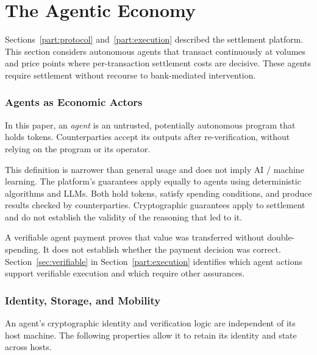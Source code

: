 \part{The Agentic Economy}\label{part:economy}

Sections~\ref{part:protocol} and~\ref{part:execution} described the settlement platform. This section considers autonomous agents that transact continuously at volumes and price points where per-transaction settlement costs are decisive. These agents require settlement without recourse to bank-mediated intervention.

\section{Agents as Economic Actors}

In this paper, an \emph{agent} is an untrusted, potentially autonomous program that holds tokens. Counterparties accept its outputs after re-verification, without relying on the program or its operator.

This definition is narrower than general usage and does not imply AI / machine learning. The platform's guarantees apply equally to agents using deterministic algorithms and LLMs. Both hold tokens, satisfy spending conditions, and produce results checked by counterparties. Cryptographic guarantees apply to settlement and do not establish the validity of the reasoning that led to it.

A verifiable agent payment proves that value was transferred without double-spending. It does not establish whether the payment decision was correct. Section~\ref{sec:verifiable} in Section~\ref{part:execution} identifies which agent actions support verifiable execution and which require other assurances.

\section{Identity, Storage, and Mobility}

An agent's cryptographic identity and verification logic are independent of its host machine. The following properties allow it to retain its identity and state across hosts.

